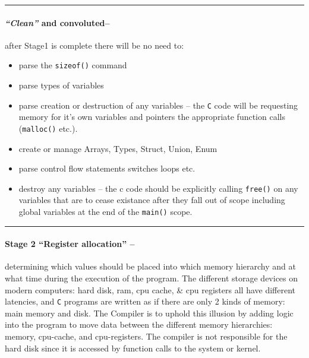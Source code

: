 \begin{center}\rule{0.5\linewidth}{0.5pt}\end{center}

\hypertarget{clean-and-convoluted}{%
\paragraph{\texorpdfstring{\emph{``Clean''} and
convoluted--}{``Clean'' and convoluted--}}\label{clean-and-convoluted}}

after Stage1 is complete there will be no need to:

\begin{itemize}
\tightlist
\item
  parse the \texttt{sizeof()} command
\item
  parse types of variables
\item
  parse creation or destruction of any variables -- the \texttt{C} code
  will be requesting memory for it's own variables and pointers the
  appropriate function calls (\texttt{malloc()} etc.).
\item
  create or manage Arrays, Types, Struct, Union, Enum
\item
  parse control flow statements switches loops etc.
\item
  destroy any variables -- the c code should be explicitly calling
  \texttt{free()} on any variables that are to cease existance after
  they fall out of scope including global variables at the end of the
  \texttt{main()} scope.
\end{itemize}

\begin{center}\rule{0.5\linewidth}{0.5pt}\end{center}

\hypertarget{stage-2-register-allocation}{%
\paragraph{Stage 2 ``Register allocation''
--}\label{stage-2-register-allocation}}

determining which values should be placed into which memory hierarchy
and at what time during the execution of the program. The different
storage devices on modern computers: hard disk, ram, cpu cache, \& cpu
registers all have different latencies, and \texttt{C} programs are
written as if there are only 2 kinds of memory: main memory and disk.
The Compiler is to uphold this illusion by adding logic into the program
to move data between the different memory hierarchies: memory,
cpu-cache, and cpu-registers. The compiler is not responsible for the
hard disk since it is accessed by function calls to the system or
kernel.


